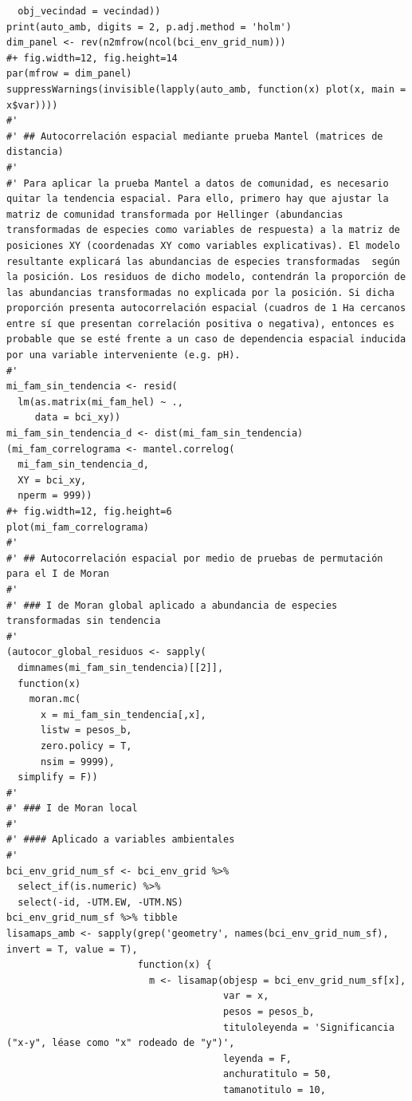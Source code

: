 \documentclass[11pt,]{article}
\begin{document}
\begin{verbatim}
  obj_vecindad = vecindad))
print(auto_amb, digits = 2, p.adj.method = 'holm')
dim_panel <- rev(n2mfrow(ncol(bci_env_grid_num)))
#+ fig.width=12, fig.height=14
par(mfrow = dim_panel)
suppressWarnings(invisible(lapply(auto_amb, function(x) plot(x, main = x$var))))
#' 
#' ## Autocorrelación espacial mediante prueba Mantel (matrices de distancia)
#' 
#' Para aplicar la prueba Mantel a datos de comunidad, es necesario quitar la tendencia espacial. Para ello, primero hay que ajustar la matriz de comunidad transformada por Hellinger (abundancias transformadas de especies como variables de respuesta) a la matriz de posiciones XY (coordenadas XY como variables explicativas). El modelo resultante explicará las abundancias de especies transformadas  según la posición. Los residuos de dicho modelo, contendrán la proporción de las abundancias transformadas no explicada por la posición. Si dicha proporción presenta autocorrelación espacial (cuadros de 1 Ha cercanos entre sí que presentan correlación positiva o negativa), entonces es probable que se esté frente a un caso de dependencia espacial inducida por una variable interveniente (e.g. pH).
#' 
mi_fam_sin_tendencia <- resid(
  lm(as.matrix(mi_fam_hel) ~ .,
     data = bci_xy))
mi_fam_sin_tendencia_d <- dist(mi_fam_sin_tendencia)
(mi_fam_correlograma <- mantel.correlog(
  mi_fam_sin_tendencia_d,
  XY = bci_xy,
  nperm = 999))
#+ fig.width=12, fig.height=6
plot(mi_fam_correlograma)
#' 
#' ## Autocorrelación espacial por medio de pruebas de permutación para el I de Moran
#' 
#' ### I de Moran global aplicado a abundancia de especies transformadas sin tendencia
#' 
(autocor_global_residuos <- sapply(
  dimnames(mi_fam_sin_tendencia)[[2]],
  function(x)
    moran.mc(
      x = mi_fam_sin_tendencia[,x],
      listw = pesos_b,
      zero.policy = T,
      nsim = 9999),
  simplify = F))
#' 
#' ### I de Moran local
#' 
#' #### Aplicado a variables ambientales
#' 
bci_env_grid_num_sf <- bci_env_grid %>%
  select_if(is.numeric) %>% 
  select(-id, -UTM.EW, -UTM.NS)
bci_env_grid_num_sf %>% tibble
lisamaps_amb <- sapply(grep('geometry', names(bci_env_grid_num_sf), invert = T, value = T),
                       function(x) {
                         m <- lisamap(objesp = bci_env_grid_num_sf[x],
                                      var = x,
                                      pesos = pesos_b,
                                      tituloleyenda = 'Significancia ("x-y", léase como "x" rodeado de "y")',
                                      leyenda = F,
                                      anchuratitulo = 50,
                                      tamanotitulo = 10,

\end{verbatim}
\end{document}
